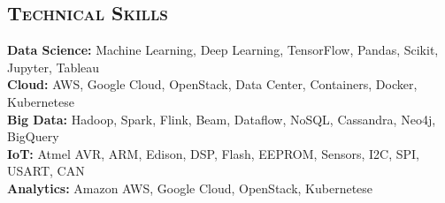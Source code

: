 \begin{resume}
\section{\textsc{Technical Skills}}
{\bf Data Science:} Machine Learning, Deep Learning, TensorFlow, Pandas, Scikit, Jupyter, Tableau\\
{\bf Cloud:} AWS, Google Cloud, OpenStack, Data Center, Containers, Docker, Kubernetese \\
{\bf Big Data:} Hadoop, Spark, Flink, Beam, Dataflow, NoSQL, Cassandra, Neo4j, BigQuery\\
{\bf IoT:} Atmel AVR, ARM, Edison, DSP, Flash, EEPROM, Sensors, I2C, SPI, USART, CAN \\
{\bf Analytics:} Amazon AWS, Google Cloud, OpenStack, Kubernetese\\ \\





\end{resume}
